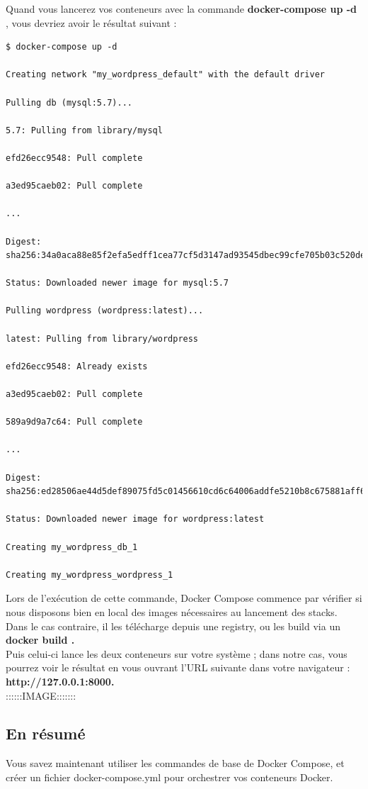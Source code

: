 \documentclass[12pt,a4paper]{article}
\begin{document}
Quand vous lancerez vos conteneurs avec la commande \textbf{docker-compose up -d}  , vous devriez avoir le résultat suivant :

\begin{verbatim}
$ docker-compose up -d

Creating network "my_wordpress_default" with the default driver

Pulling db (mysql:5.7)...

5.7: Pulling from library/mysql

efd26ecc9548: Pull complete

a3ed95caeb02: Pull complete

...

Digest: sha256:34a0aca88e85f2efa5edff1cea77cf5d3147ad93545dbec99cfe705b03c520de

Status: Downloaded newer image for mysql:5.7

Pulling wordpress (wordpress:latest)...

latest: Pulling from library/wordpress

efd26ecc9548: Already exists

a3ed95caeb02: Pull complete

589a9d9a7c64: Pull complete

...

Digest: sha256:ed28506ae44d5def89075fd5c01456610cd6c64006addfe5210b8c675881aff6

Status: Downloaded newer image for wordpress:latest

Creating my_wordpress_db_1

Creating my_wordpress_wordpress_1
\end{verbatim}

Lors de l'exécution de cette commande, Docker Compose commence par vérifier si nous disposons bien en local des images nécessaires au lancement des stacks. Dans le cas contraire, il les télécharge depuis une registry, ou les build via un \textbf{docker build  .}\\

Puis celui-ci lance les deux conteneurs sur votre système ; dans notre cas, vous pourrez voir le résultat en vous ouvrant l'URL suivante dans votre navigateur : \textbf{ http://127.0.0.1:8000.}\\
::::::IMAGE:::::::
\subsection{En résumé}
Vous savez maintenant utiliser les commandes de base de Docker Compose, et créer un fichier docker-compose.yml pour orchestrer vos conteneurs Docker.\\
\end{document}
